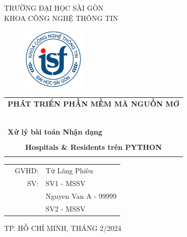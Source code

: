 \documentclass[a4paper]{article}
\begin{document}
\begin{titlepage}
\begin{center}
TRƯỜNG ĐẠI HỌC SÀI GÒN \\
KHOA CÔNG NGHỆ THÔNG TIN
\end{center}
\vspace{1cm}

\begin{figure}[h!]
\begin{center}
\includegraphics[width=3cm]{logoITSGU.png}
\end{center}
\end{figure}

\vspace{1cm}


\begin{center}
\begin{tabular}{c}
	\multicolumn{1}{l}{\textbf{{\Large PHÁT TRIỂN PHẦN MỀM MÃ NGUỒN MỞ}}}\\
	~~\\
	\hline
	\\
	\multicolumn{1}{l}{\textbf{{\Large Xử lý bài toán Nhận dạng}}}\\
	\\
	
	\textbf{{\Huge Hospitals \& Residents trên PYTHON}}\\
	\\
	\hline
\end{tabular}
\end{center}

\vspace{3cm}

\begin{table}[h]
\begin{tabular}{rrl}
\hspace{5 cm} & GVHD: &Từ Lãng Phiêu\\
& SV: & SV1 - MSSV\\
& & Nguyen Van A - 99999 \\
& & SV2 - MSSV \\
\end{tabular}
\vspace{1.5 cm}
\end{table}

\begin{center}

{\footnotesize TP. HỒ CHÍ MINH, THÁNG 2/2024}
\end{center}
\end{titlepage}
\end{document}
